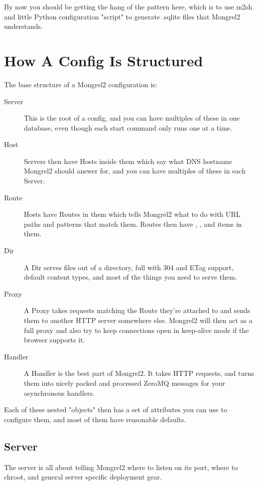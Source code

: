 By now you should be getting the hang of the pattern here, which is to use
m2sh and little Python configuration "script" to generate .sqlite files
that Mongrel2 understands.

\section{How A Config Is Structured}

The base structure of a Mongrel2 configuration is:

\begin{description}
\item[Server] This is the root of a config, and you can have multiples of these in one database,
    even though each start command only runs one at a time.
\item[Host] Servers then have Hosts inside them which say what DNS hostname Mongrel2 should answer for, and
    you can have multiples of these in each Server.
\item[Route] Hosts have Routes in them which tells Mongrel2 what to do with URL paths and patterns
    that match them.  Routes then have , , and  items in them.
\item[Dir] A Dir serves files out of a directory, full with 304 and ETag support, default content types, 
    and most of the things you need to serve them.
\item[Proxy] A Proxy takes requests matching the Route they're attached to and sends them to another
    HTTP server somewhere else.  Mongrel2 will then act as a full proxy and also try to keep connections
    open in keep-alive mode if the browser supports it.
\item[Handler] A Handler is the best part of Mongrel2.  It takes HTTP requests, and turns them into 
    nicely packed and processed ZeroMQ messages for your asynchronous handlers.
\end{description}

Each of these nested "objects" then has a set of attributes you can use to configure them, and
most of them have reasonable defaults.


\subsection{Server}

The server is all about telling Mongrel2 where to listen on its port, where to chroot,
and general server specific deployment gear.

